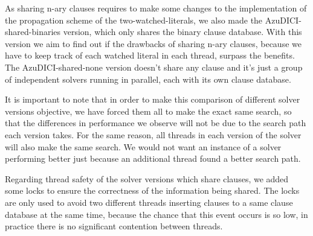 As sharing n-ary clauses requires to make some changes to the
implementation of the propagation scheme of the two-watched-literals,
we also made the AzuDICI-shared-binaries version, which only shares
the binary clause database. With this version we aim to find out
if the drawbacks of sharing n-ary clauses, because we have to keep
track of each watched literal in each thread, surpass the benefits.
The AzuDICI-shared-none version doesn't share any clause and it's
just a group of independent solvers running in parallel, each with
its own clause database.

It is important to note that in order to make this comparison of
different solver versions objective, we have forced them all to make
the exact same search, so that the differences in performance we
observe will not be due to the search path each version takes.
For the same reason, all threads in each version of the solver will
also make the same search. We would not want an instance of a
solver performing better just because an additional thread found
a better search path.

Regarding thread safety of the solver versions which share clauses,
we added some locks to ensure the correctness of the information
being shared. The locks are only used to avoid two different threads
inserting clauses to a same clause database at the same time,
because the chance that this event occurs is so low, in practice
there is no significant contention between threads.

